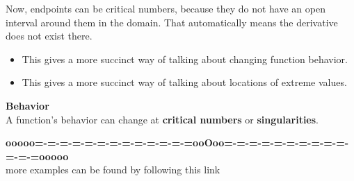 \documentclass{ximera}
\begin{document}
Now, endpoints can be critical numbers, because they do not have an open interval around them in the domain.  That automatically means the derivative does not exist there. \\






\begin{itemize}
\item This gives a more succinct way of talking about changing function behavior. 
\item This gives a more succinct way of talking about locations of extreme values. 
\end{itemize}




\begin{idea} \textbf{\textcolor{green!50!black}{Behavior}} \\


A function's behavior can change at \textbf{critical numbers} or \textbf{singularities}.






\end{idea}















\begin{center}
\textbf{\textcolor{green!50!black}{ooooo=-=-=-=-=-=-=-=-=-=-=-=-=ooOoo=-=-=-=-=-=-=-=-=-=-=-=-=ooooo}} \\

more examples can be found by following this link\\ 

\end{center}
\end{document}
